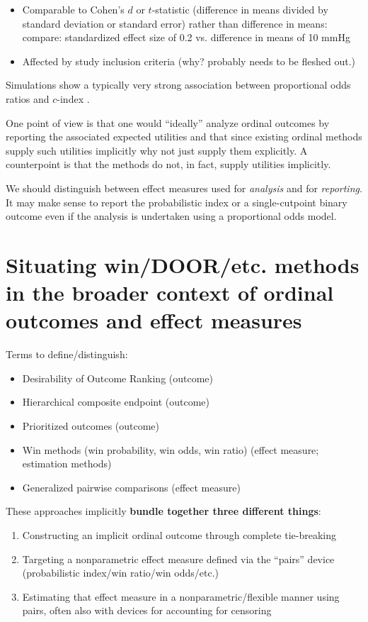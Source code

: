 \documentclass[
  11pt,
  fleqn
]{article}
\begin{document}
\begin{itemize}
  \item Comparable to Cohen's $d$ or $t$-statistic (difference in
    means divided by standard deviation or standard error) rather than
    difference in means: compare: standardized effect size of 0.2 vs.
    difference in means of 10 mmHg
  \item Affected by study inclusion criteria (why? probably needs to
    be fleshed out.)
\end{itemize}

Simulations show a typically very strong association between
proportional odds ratios and $c$-index
\citep{harrellViolationProportionalOdds2020}.

One point of view is that one would ``ideally'' analyze ordinal
outcomes by reporting the associated expected utilities  and that since
existing ordinal methods supply such utilities implicitly why not
just supply them explicitly. A counterpoint is that the methods do not, in fact,
supply utilities implicitly.

We should distinguish between effect measures used for \emph{analysis} and for
\emph{reporting}. It may make sense to report the probabilistic index or a
single-cutpoint binary outcome even if the analysis is undertaken using a
proportional odds model.

\section{Situating win/DOOR/etc. methods in the broader context of ordinal
outcomes and effect measures}

Terms to define/distinguish:
\begin{itemize}
  \item Desirability of Outcome Ranking (outcome)
  \item Hierarchical composite endpoint (outcome)
  \item Prioritized outcomes (outcome)
  \item Win methods (win probability, win odds, win ratio) (effect
    measure; estimation methods)
  \item Generalized pairwise comparisons (effect measure)
\end{itemize}

These approaches implicitly \textbf{bundle together three different things}:
\begin{enumerate}
  \item Constructing an implicit ordinal outcome through
    complete tie-breaking
  \item Targeting a nonparametric effect measure defined via the
    ``pairs'' device (probabilistic
    index/win ratio/win odds/etc.)
  \item Estimating that effect measure in a nonparametric/flexible
    manner using pairs, often also with devices for accounting for censoring
\end{enumerate}
\end{document}
